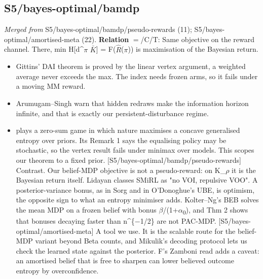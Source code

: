 \documentclass[10pt]{article}
\begin{document}
\subsection{S5/bayes-optimal/bamdp}\label{node:S5-S5-bayes-optimal-bamdp}
\textit{Merged from} S5/bayes-optimal/bamdp/pseudo-rewards (11); S5/bayes-optimal/amortised-meta (22). \textbf{Relation} $=$/\textsf{C}/\textsf{T}: Same objective on the reward channel. There, min H[d\^{}\ensuremath{\pi} \ensuremath{\bar{K}}] = F(\ensuremath{\hat{R}}(\ensuremath{\pi})) is maximisation of the Bayesian return.
\begin{itemize}[nosep,leftmargin=1.2em]
\item Gittins' DAI theorem is proved by the linear vertex argument, a weighted average never exceeds the max. The index needs frozen arms, so it fails under a moving MM reward.
\item Arumugam--Singh warn that hidden redraws make the information horizon infinite, and that is exactly our persistent-disturbance regime.
\item \citet{Androulakis-generalised14} plays a zero-sum game in which nature maximises a concave generalised entropy over priors. Its Remark 1 says the equalising policy may be stochastic, so the vertex result fails under minimax over models. This scopes our theorem to a fixed prior. [S5/bayes-optimal/bamdp/pseudo-rewards] Contrast. Our belief-MDP objective is not a pseudo-reward: on K\_\ensuremath{\rho} it is the Bayesian return itself. Lidayan classes SMiRL as "no VOI, repulsive VOO". A posterior-variance bonus, as in Sorg and in O'Donoghue's UBE, is optimism, the opposite sign to what an entropy minimiser adds. Kolter--Ng's BEB solves the mean MDP on a frozen belief with bonus \ensuremath{\beta}/(1+\ensuremath{\alpha}\textsubscript{0}), and Thm 2 shows that bonuses decaying faster than n\^{}\{\ensuremath{-}1/2\} are not PAC-MDP. [S5/bayes-optimal/amortised-meta] A tool we use. It is the scalable route for the belief-MDP variant beyond Beta counts, and Mikulik's decoding protocol lets us check the learned state against the posterior. F's Zamboni read adds a caveat: an amortised belief that is free to sharpen can lower believed outcome entropy by overconfidence.
\end{itemize}
\end{document}
